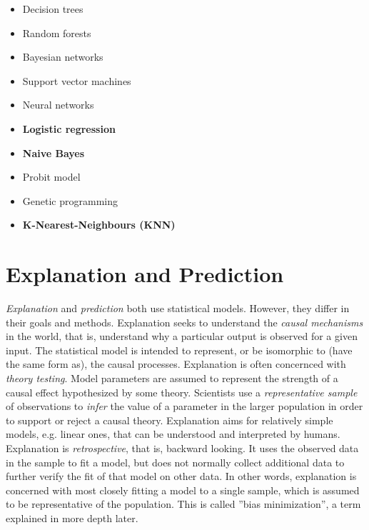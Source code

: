 \begin{itemize}
   \item Decision trees
   \item Random forests
   \item Bayesian networks
   \item Support vector machines
   \item Neural networks
   \item \textbf{Logistic regression}
   \item \textbf{Naive Bayes}
   \item Probit model
   \item Genetic programming
   \item \textbf{K-Nearest-Neighbours (KNN)}
\end{itemize}

\section{Explanation and Prediction}

\emph{Explanation} and \emph{prediction} both use statistical models. However, they differ in their goals and methods. Explanation seeks to understand the \emph{causal mechanisms} in the world, that is, understand why a particular output is observed for a given input. The statistical model is intended to represent, or be isomorphic to (have the same form as), the causal processes. Explanation is often concernced with \emph{theory testing}. Model parameters are assumed to represent the strength of a causal effect hypothesized by some theory. Scientists use a \emph{representative sample} of observations to \emph{infer} the value of a parameter in the larger population in order to support or reject a causal theory. Explanation aims for relatively simple models, e.g. linear ones, that can be understood and interpreted by humans. Explanation is \emph{retrospective}, that is, backward looking. It uses the observed data in the sample to fit a model, but does not normally collect additional data to further verify the fit of that model on other data. In other words, explanation is concerned with most closely fitting a model to a single sample, which is assumed to be representative of the population. This is called ''bias minimization'', a term explained in more depth later. 

